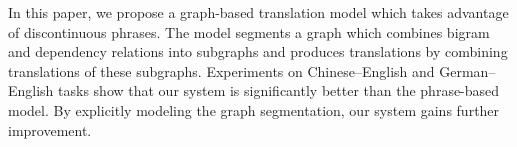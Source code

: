 In this paper, we propose a graph-based translation model which takes advantage of discontinuous phrases. The model segments a graph which combines bigram and dependency relations into subgraphs and produces translations by combining translations of these subgraphs. Experiments on Chinese--English and German--English tasks show that our system is significantly better than the phrase-based model. By explicitly modeling the graph segmentation, our system gains further improvement.
